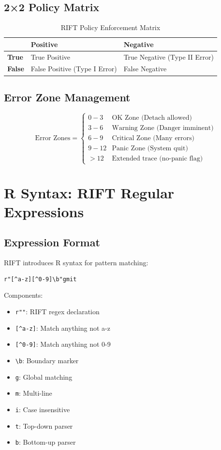 \documentclass[12pt]{article}
\begin{document}
\subsection{2×2 Policy Matrix}
\begin{table}[H]
\centering
\caption{RIFT Policy Enforcement Matrix}
\begin{tabular}{|l|l|l|}
\hline
& \textbf{Positive} & \textbf{Negative} \\
\hline
\textbf{True} & True Positive & True Negative (Type II Error) \\
\hline
\textbf{False} & False Positive (Type I Error) & False Negative \\
\hline
\end{tabular}
\end{table}

\subsection{Error Zone Management}
\begin{equation}
\text{Error Zones} = \begin{cases}
0-3 & \text{OK Zone (Detach allowed)} \\
3-6 & \text{Warning Zone (Danger imminent)} \\
6-9 & \text{Critical Zone (Many errors)} \\
9-12 & \text{Panic Zone (System quit)} \\
>12 & \text{Extended trace (no-panic flag)}
\end{cases}
\end{equation}

\section{R Syntax: RIFT Regular Expressions}

\subsection{Expression Format}
RIFT introduces R syntax for pattern matching:
\begin{lstlisting}[language=rift]
r"[^a-z][^0-9]\b"gmit
\end{lstlisting}

Components:
\begin{itemize}
\item \texttt{r""}: RIFT regex declaration
\item \texttt{[\^{}a-z]}: Match anything not a-z
\item \texttt{[\^{}0-9]}: Match anything not 0-9
\item \texttt{\textbackslash b}: Boundary marker
\item \texttt{g}: Global matching
\item \texttt{m}: Multi-line
\item \texttt{i}: Case insensitive
\item \texttt{t}: Top-down parser
\item \texttt{b}: Bottom-up parser
\end{itemize}
\end{document}
